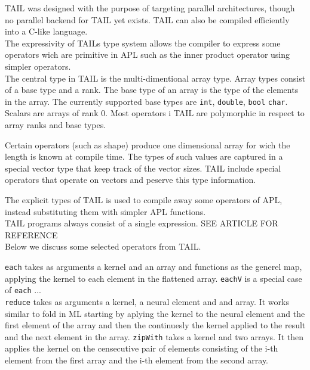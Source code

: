 \documentclass[11pt]{article}
\begin{document}
TAIL was designed with the purpose of targeting parallel architectures, though no parallel backend for TAIL yet exists. TAIL can also be compiled efficiently into a C-like language. \cite{ElsmanDybdal:Array:2014}\\

The expressivity of TAILs type system allows the compiler to express some operators wich are primitive in APL such as the inner product operator using simpler operators. \\

The central type in TAIL is the multi-dimentional array type. Array types consist of a base type and a rank. The base type of an array is the type of the elements in the array.  The currently supported base types are {\tt int}, {\tt double}, {\tt bool} {\tt char}. Scalars are arrays of rank 0. Most operators i TAIL are polymorphic in respect to array ranks and base types. 

Certain operators (such as shape) produce one dimensional array for wich the length is known at compile time. The types of such values are captured in a special vector type that keep track of the vector sizes. 
TAIL include special operators that operate on vectors and peserve this type information. 

The explicit types of TAIL is used to compile away some operators of APL, instead substituting them with simpler APL functions. \\

TAIL programs always consist of a single expression. SEE ARTICLE FOR REFERENCE \\

Below we discuss some selected operators from TAIL.

{\tt each} takes as arguments a kernel and an array and functions as the generel map, applying the kernel to each element in the flattened array. 
{\tt eachV} is a special case of {\tt each} ...\\
{\tt reduce} takes as arguments a kernel, a neural element and and array. It works similar to fold in ML starting by aplying the kernel to the neural element and the first element of the array and then the continuesly the kernel applied to the result and the next element in the array. 
{\tt zipWith} takes a kernel and two arrays. It then applies the kernel on the censecutive pair of elements consisting of the i-th element from the first array and the i-th element from the second array. 
\end{document}
